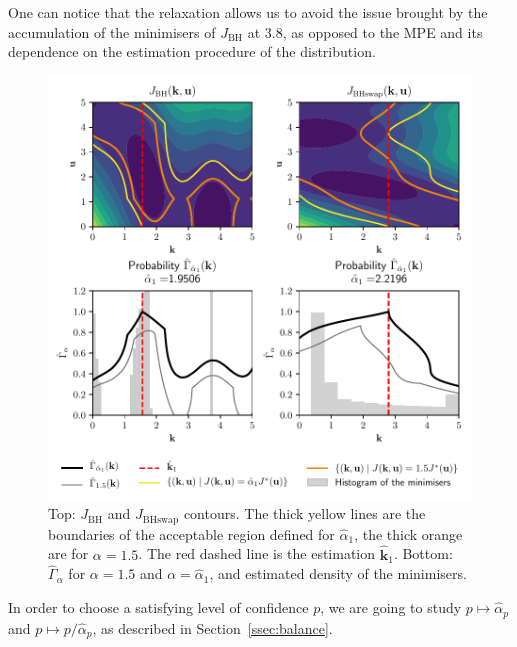 \documentclass[preprint, 1p]{elsarticle}
\newcommand{\Ex}{\mathbb{E}}
\newcommand{\hatkmean}{\hat{\mathbf{k}}_{\Ex}}
\newcommand{\hatkvar}{\hat{\mathbf{k}}_{\mathbb{V}}}
\newcommand{\checka}{{\alpha}}
\newcommand{\checkk}{\mathbf{k}}
\newcommand{\JBH}{J_{\mathrm{BH}}}
\newcommand{\JBHS}{J_{\mathrm{BHswap}}}
\newlength{\onehalfcolumn}
\begin{document}
One can notice that the relaxation allows us to avoid the issue brought by the accumulation of the minimisers of $\JBH$ at $3.8$, as opposed to the MPE and its dependence on the estimation procedure of the distribution.

\begin{figure}[!ht]
  \centering
  \includegraphics[width=\onehalfcolumn]{Figures/FIG05.pdf}
\caption{Top: $\JBH$ and $\JBHS$ contours. The thick yellow lines are the boundaries of the acceptable region defined for $\hat{\checka}_1$, the thick orange are for $\alpha=1.5$. The red dashed line is the estimation $\hat{\checkk}_1$. Bottom: $\hat{\Gamma}_{\alpha}$ for $\alpha = 1.5$ and $\alpha=\hat{\checka}_1$, and estimated density of the minimisers.}
\label{fig:contour_alpha}
\end{figure}


In order to choose a satisfying level of confidence $p$, we are going to study $p\mapsto \hat{\checka}_p$ and $p\mapsto p/\hat{\checka}_p$, as described in Section~\ref{ssec:balance}.
\end{document}
